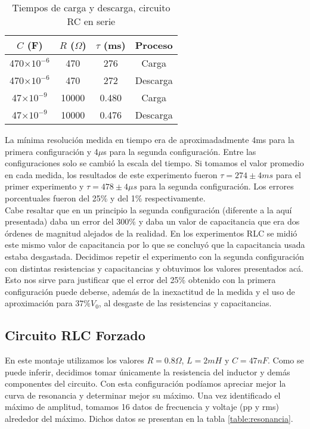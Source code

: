 \documentclass[%
 reprint,
 amsmath,amssymb,
 aps,
]{revtex4-1}
\begin{document}
\begin{table}[h!]
\centering
\begin{tabular}{|c|c|c|c|}
\hline
$C$ (F) & $R$ ($\Omega$) & $\tau$ (ms) & Proceso\\
\hline
470$\times 10^{-6}$ & 470 & 276 & Carga\\
470$\times 10^{-6}$ & 470 & 272 & Descarga\\
47$\times 10^{-9}$ & 10000 & 0.480 & Carga\\
47$\times 10^{-9}$ & 10000 & 0.476 & Descarga\\
\hline
\end{tabular}
\caption{Tiempos de carga y descarga, circuito RC en serie}
\end{table}

La mínima resolución medida en tiempo era de aproximadadmente 4ms para la primera configuración y 4$\mu$s para la segunda configuración. Entre las configuraciones solo se cambió la escala del tiempo. Si tomamos el valor promedio en cada medida, los resultados de este experimento fueron $\tau = 274 \pm 4ms$ para el primer experimento y $\tau = 478 \pm 4\mu s$ para la  segunda configuración. Los errores porcentuales fueron del  25\% y del 1\% respectivamente. \\

Cabe resaltar que en un principio la segunda configuración (diferente a la aquí presentada) daba un error del 300\% y daba un valor de capacitancia que era dos órdenes de magnitud alejados de la realidad. En los experimentos RLC se midió este mismo valor de capacitancia por lo que se concluyó que la capacitancia usada estaba desgastada. Decidimos repetir el experimento con la segunda configuración con distintas resistencias y capacitancias y obtuvimos los valores presentados acá. Esto nos sirve para justificar que el error del 25\% obtenido con la primera configuración puede deberse, además de la inexactitud de la medida y el uso de aproximación para $37\% V_0$, al desgaste de las resistencias y capacitancias.\\


\subsection{\label{sec:level2}Circuito RLC Forzado}
En este montaje utilizamos los valores $R = 0.8\Omega$, $L = 2mH$ y $C = 47nF$. Como se puede inferir, decidimos tomar \'unicamente la resistencia del inductor y dem\'as componentes del circuito. Con esta configuraci\'on pod\'iamos apreciar mejor la curva de resonancia y determinar mejor su m\'aximo. Una vez identificado el m\'aximo de amplitud, tomamos 16 datos de frecuencia y voltaje (pp y rms) alrededor del m\'aximo. Dichos datos se presentan en la tabla \ref{table:resonancia}. \\
\end{document}
